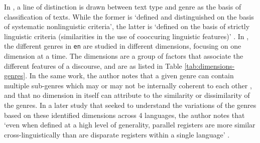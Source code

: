 In \cite{biber2}, a line of distinction is drawn between text type and genre as the basis of classification of texts. While the former is `defined and distinguished on the basis of systematic nonlinguistic criteria', the latter is `defined on the basis of strictly linguistic criteria (similarities in the use of cooccuring linguistic features)' \cite[p.~39]{biber2}. In \cite{biber}, the different genres in \verb|en| are studied in different dimensions, focusing on one dimension at a time. The dimensions are a group of factors that associate the different features of a discourse, and are as listed in Table \ref{tab:dimensions-genres}. In the same work, the author notes that a given genre can contain multiple sub-genres which may or may not be internally coherent to each other \cite[p.~170]{biber}, and that no dimension in itself can attribute to the similarity or dissimilarity of the genres. In a later study that seeked to understand the variations of the genres based on these identified dimensions across 4 languages, the author notes that `even when defined at a high level of generality, parallel registers are more similar cross-linguistically than are disparate registers within a single language' \cite[p.~279]{biberbook}.

